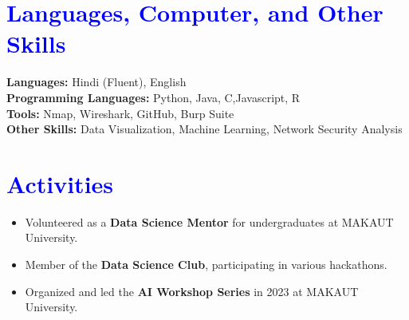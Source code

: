\documentclass[a4paper,10pt]{article}
\begin{document}
\vspace{15pt}

\section*{\textcolor{blue}{Languages, Computer, and Other Skills}}
\textbf{Languages:} Hindi (Fluent), English\\
\textbf{Programming Languages:} Python, Java, C,Javascript, R\\
\textbf{Tools:} Nmap, Wireshark, GitHub, Burp Suite\\
\textbf{Other Skills:} Data Visualization, Machine Learning, Network Security Analysis

\vspace{15pt}

\section*{\textcolor{blue}{Activities}}
\begin{itemize}
    \item Volunteered as a \textbf{Data Science Mentor} for undergraduates at MAKAUT University.
    \item Member of the \textbf{Data Science Club}, participating in various hackathons.
    \item Organized and led the \textbf{AI Workshop Series} in 2023 at MAKAUT University.
\end{itemize}
\end{document}

